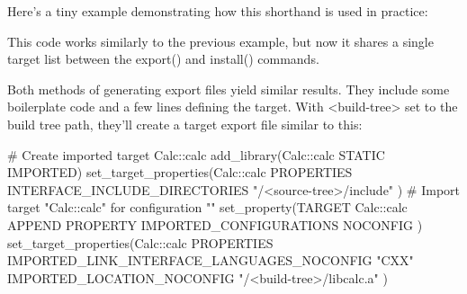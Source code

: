 Here’s a tiny example demonstrating how this shorthand is used in practice:



This code works similarly to the previous example, but now it shares a single target list between the export() and install() commands.

Both methods of generating export files yield similar results. They include some boilerplate code and a few lines defining the target. With <build-tree> set to the build tree path, they’ll create a target export file similar to this:


\begin{cmake}
# Create imported target Calc::calc
add_library(Calc::calc STATIC IMPORTED)
set_target_properties(Calc::calc PROPERTIES
    INTERFACE_INCLUDE_DIRECTORIES
    "/<source-tree>/include"
)
# Import target "Calc::calc" for configuration ""
set_property(TARGET Calc::calc APPEND PROPERTY
    IMPORTED_CONFIGURATIONS NOCONFIG
)
set_target_properties(Calc::calc PROPERTIES
    IMPORTED_LINK_INTERFACE_LANGUAGES_NOCONFIG "CXX"
    IMPORTED_LOCATION_NOCONFIG "/<build-tree>/libcalc.a"
)
\end{cmake}

